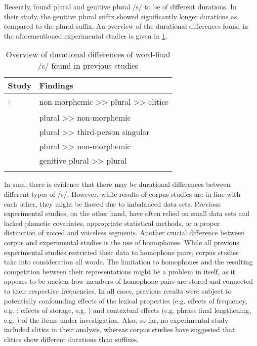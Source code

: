 Recently, \citet{Plag2020} found plural and genitive plural /s/ to be of different durations. In their study, the genitive plural suffix showed significantly longer durations as compared to the plural suffix. An overview of the durational differences found in the aforementioned experimental studies is given in \ref{tab:2.1}.

\begin{table}\fontsize{10}{11}
\caption{Overview of durational differences of word-final /s/ found in previous studies}
\label{tab:2.1}
\begin{tabular}{ll}
\lsptoprule
Study                                & Findings                                         \\
\midrule
\cite{Zimmermann2016, Plag2017}; & \multirow{2}{*}{non-morphemic >>
plural >> clitics}  \\
\cite{Tomaschek2019}               &                                                  \\
\cite{Walsh1983}                  & plural >> non-morphemic                            \\
\cite{Hsieh1999}                   & plural >> third-person singular                    \\
\cite{Seyfarth2017}                & plural >> non-morphemic                            \\
\cite{Plag2020}                    & genitive plural >> plural                 \\
\lspbottomrule
\end{tabular}
\end{table}

In sum, there is evidence that there may be durational differences between different types of /s/. However, while results of corpus studies are in line with each other, they might be flawed due to imbalanced data sets. Previous experimental studies, on the other hand, have often relied on small data sets and lacked phonetic covariates, appropriate statistical methods, or a proper distinction of voiced and voiceless segments. Another crucial difference between corpus and experimental studies is the use of homophones. While all previous experimental studies restricted their data to homophone pairs, corpus studies take into consideration all words. The limitation to homophones and the resulting competition between their representations might be a problem in itself, as it appears to be unclear how members of homophone pairs are stored and connected to their respective frequencies. In all cases, previous results were subject to potentially confounding effects of the lexical properties (e.g. effects of frequency, e.g. \cite{Gahl2008,Lohmann2018}; effects of storage, e.g. \cite{Caselli2016}) and contextual effects (e.g. phrase final lengthening, e.g. \cite{Klatt1976,Wightman1992}) of the items under investigation. Also, so far, no experimental study included clitics in their analysis, whereas corpus studies have suggested that clitics show different durations than suffixes.

